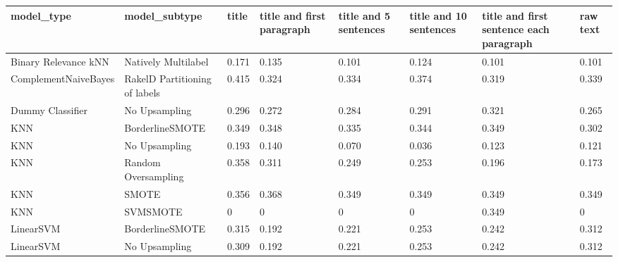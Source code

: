 \begin{tabular}{llllllll}
\toprule
                     model\_type &                 model\_subtype & title & title and first paragraph & title and 5 sentences & title and 10 sentences & title and first sentence each paragraph &  raw text \\
\midrule
           Binary Relevance kNN &           Natively Multilabel & 0.171 &                     0.135 &                 0.101 &                  0.124 &                                   0.101 &     0.101 \\
           ComplementNaiveBayes & RakelD Partitioning of labels & 0.415 &                     0.324 &                 0.334 &                  0.374 &                                   0.319 &     0.339 \\
               Dummy Classifier &                 No Upsampling & 0.296 &                     0.272 &                 0.284 &                  0.291 &                                   0.321 &     0.265 \\
                            KNN &               BorderlineSMOTE & 0.349 &                     0.348 &                 0.335 &                  0.344 &                                   0.349 &     0.302 \\
                            KNN &                 No Upsampling & 0.193 &                     0.140 &                 0.070 &                  0.036 &                                   0.123 &     0.121 \\
                            KNN &           Random Oversampling & 0.358 &                     0.311 &                 0.249 &                  0.253 &                                   0.196 &     0.173 \\
                            KNN &                         SMOTE & 0.356 &                     0.368 &                 0.349 &                  0.349 &                                   0.349 &     0.349 \\
                            KNN &                      SVMSMOTE &     0 &                         0 &                     0 &                      0 &                                   0.349 &         0 \\
                      LinearSVM &               BorderlineSMOTE & 0.315 &                     0.192 &                 0.221 &                  0.253 &                                   0.242 &     0.312 \\
                      LinearSVM &                 No Upsampling & 0.309 &                     0.192 &                 0.221 &                  0.253 &                                   0.242 &     0.312 \\

\end{tabular}

